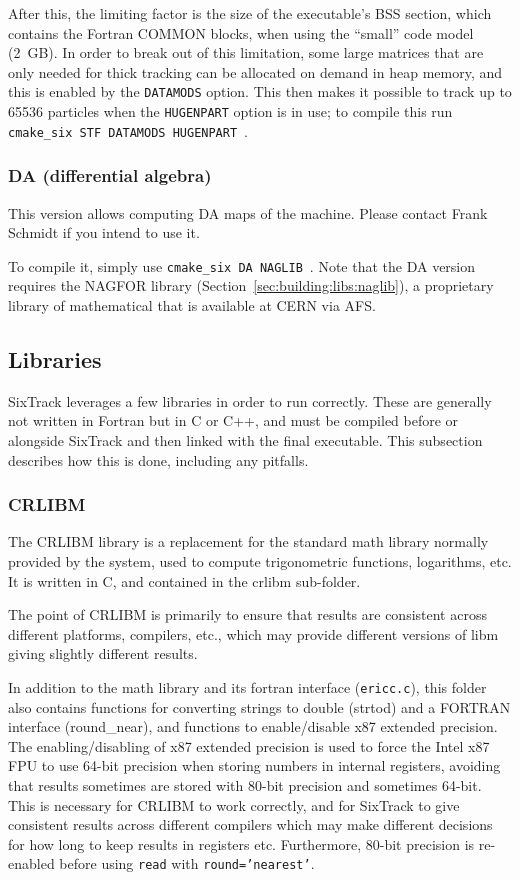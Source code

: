 \documentclass[english]{article}
\begin{document}
After this, the limiting factor is the size of the executable's BSS section, which contains the Fortran COMMON blocks, when using the ``small'' code model (2~GB).
In order to break out of this limitation, some large matrices that are only needed for thick tracking can be allocated on demand in heap memory, and this is enabled by the \texttt{DATAMODS} option.
This then makes it possible to track up to 65536 particles when the \texttt{HUGENPART} option is in use; to compile this run \texttt{cmake\_six STF DATAMODS HUGENPART}~.


\subsubsection{DA (differential algebra)}
This version allows computing DA maps of the machine.
Please contact Frank Schmidt if you intend to use it.

To compile it, simply use \texttt{cmake\_six DA NAGLIB}~.
Note that the DA version requires the NAGFOR library (Section~\ref{sec:building:libs:naglib}), a proprietary library of mathematical that is available at CERN via AFS.

\subsection{Libraries}
SixTrack leverages a few libraries in order to run correctly.
These are generally not written in Fortran but in C or C++, and must be compiled before or alongside SixTrack and then linked with the final executable.
This subsection describes how this is done, including any pitfalls.

\subsubsection{CRLIBM}
\label{sec:building:libs:crlibm}
The CRLIBM library  is a replacement for the standard math library normally provided by the system, used to compute trigonometric functions, logarithms, etc.
It is written in C, and contained in the \textrm{crlibm} sub-folder.

The point of CRLIBM is primarily to ensure that results are consistent across different platforms, compilers, etc., which may provide different versions of libm giving slightly different results.

In addition to the math library and its fortran interface (\texttt{ericc.c}), this folder also contains functions for converting strings to double (\textrm{strtod}) and a FORTRAN interface (\textrm{round\_near}), and functions to enable/disable x87 extended precision.
The enabling/disabling of x87 extended precision is used to force the Intel x87 FPU to use 64-bit precision when storing numbers in internal registers, avoiding that results sometimes are stored with 80-bit precision and sometimes 64-bit.
This is necessary for CRLIBM to work correctly, and for SixTrack to give consistent results across different compilers which may make different decisions for how long to keep results in registers etc.
Furthermore, 80-bit precision is re-enabled before using \texttt{read} with \texttt{round='nearest'}.
\end{document}
